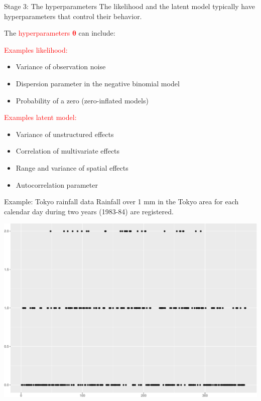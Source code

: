 \documentclass[
  ignorenonframetext,
]{beamer}
\providecommand{\tightlist}{%
  \setlength{\itemsep}{0pt}\setlength{\parskip}{0pt}}
\begin{document}
\begin{frame}{Stage 3: The hyperparameters}
\protect\hypertarget{stage-3-the-hyperparameters}{}
The likelihood and the latent model typically have hyperparameters that
control their behavior.

The \textcolor{red}{hyperparameters \(\boldsymbol{\theta}\)} can
include:

\pause

\textcolor{red}{Examples likelihood:}

\begin{itemize}
\tightlist
\item
  Variance of observation noise
\item
  Dispersion parameter in the negative binomial model
\item
  Probability of a zero (zero-inflated models)
\end{itemize}

\pause

\textcolor{red}{Examples latent model:}

\begin{itemize}
\tightlist
\item
  Variance of unstructured effects
\item
  Correlation of multivariate effects
\item
  Range and variance of spatial effects
\item
  Autocorrelation parameter
\end{itemize}
\end{frame}

\begin{frame}{Example: Tokyo rainfall data}
\protect\hypertarget{example-tokyo-rainfall-data}{}
Rainfall over 1 mm in the Tokyo area for each calendar day during two
years (1983-84) are registered.

\begin{center}\includegraphics[width=0.6\linewidth]{Part1_intro_files/figure-beamer/unnamed-chunk-8-1} \end{center}
\end{frame}
\end{document}
